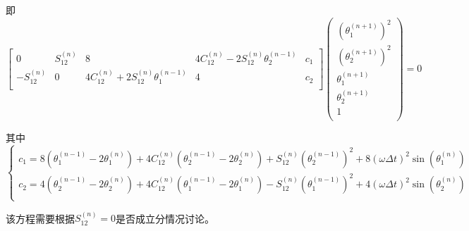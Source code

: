 \documentclass[UTF8]{ctexart}
\begin{document}
			即
			\begin{equation}
				\left[
					\begin{matrix}
						0             & S_{12}^{(n)}      & 8                                                  & 4 C_{12}^{(n)} - 2 S_{12}^{(n)}\theta_{2}^{(n-1)} & c_{1}    \\
						-S_{12}^{(n)} & 0                 & 4 C_{12}^{(n)} + 2 S_{12}^{(n)} \theta_{1}^{(n-1)} & 4                                    & c_{2}    \\
					\end{matrix}
				\right]
				\left(
					\begin{matrix}
						\left(\theta_{1}^{(n + 1)}\right)^2     \\
						\left(\theta_{2}^{(n + 1)}\right)^2     \\
						\theta_{1}^{(n + 1)}         \\
						\theta_{2}^{(n + 1)}         \\
						1                            \\
					\end{matrix}
				\right)
				=
				0
			\end{equation}

			其中
			\begin{equation}
				\begin{cases}
					c_{1} = 8 \left(\theta_{1}^{(n - 1)} - 2 \theta_{1}^{(n)}\right) + 4 C_{12}^{(n)} \left(\theta_{2}^{(n - 1)} - 2 \theta_{2}^{(n)}\right) + S_{12}^{(n)} \left(\theta_{2}^{(n - 1)}\right)^2 + 8 \left(\omega \Delta t\right)^{2} \sin\left(\theta_{1}^{(n)}\right)    \\
					c_{2} = 4 \left(\theta_{2}^{(n - 1)} - 2 \theta_{2}^{(n)}\right) + 4 C_{12}^{(n)} \left(\theta_{1}^{(n - 1)} - 2 \theta_{1}^{(n)}\right) - S_{12}^{(n)} \left(\theta_{1}^{(n - 1)}\right)^2 + 4 \left(\omega \Delta t\right)^{2} \sin\left(\theta_{2}^{(n)}\right)\\
				\end{cases}
			\end{equation}

			该方程需要根据$S_{12}^{(n)} = 0$是否成立分情况讨论。
\end{document}
